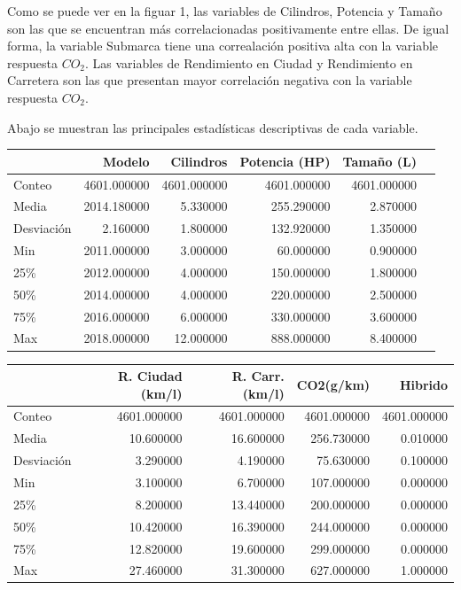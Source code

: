\documentclass{article}
\begin{document}
Como se puede ver en la figuar 1, las variables de Cilindros, Potencia y Tamaño son las que se encuentran más correlacionadas positivamente entre ellas. De igual forma, la variable Submarca tiene una correalación positiva alta con la variable respuesta $CO_2$. Las variables de Rendimiento en Ciudad y Rendimiento en Carretera son las que presentan mayor correlación negativa con la variable respuesta $CO_2$.

Abajo se muestran las principales estadísticas descriptivas de cada variable.

\begin{tabular}{lrrrrr}
\toprule
 & Modelo & Cilindros & Potencia (HP) & Tamaño (L)\\
\midrule
Conteo & 4601.000000 & 4601.000000 & 4601.000000 & 4601.000000\\
Media & 2014.180000 & 5.330000 & 255.290000 & 2.870000\\
Desviación & 2.160000 & 1.800000 & 132.920000 & 1.350000\\
Min & 2011.000000 & 3.000000 & 60.000000 & 0.900000\\
25\% & 2012.000000 & 4.000000 & 150.000000 & 1.800000\\
50\% & 2014.000000 & 4.000000 & 220.000000 & 2.500000\\
75\% & 2016.000000 & 6.000000 & 330.000000 & 3.600000\\
Max & 2018.000000 & 12.000000 & 888.000000 & 8.400000\\
\bottomrule
\end{tabular}

\begin{tabular}{lrrrr}
\toprule
 & R. Ciudad (km/l) & R. Carr. (km/l) & CO2(g/km) & Hibrido \\
\midrule
Conteo & 4601.000000 & 4601.000000 & 4601.000000 & 4601.000000 \\
Media & 10.600000 & 16.600000 & 256.730000 & 0.010000 \\
Desviación & 3.290000 & 4.190000 & 75.630000 & 0.100000 \\
Min & 3.100000 & 6.700000 & 107.000000 & 0.000000 \\
25\% & 8.200000 & 13.440000 & 200.000000 & 0.000000 \\
50\% & 10.420000 & 16.390000 & 244.000000 & 0.000000 \\
75\% & 12.820000 & 19.600000 & 299.000000 & 0.000000 \\
Max & 27.460000 & 31.300000 & 627.000000 & 1.000000 \\
\bottomrule
\end{tabular}
\end{document}
